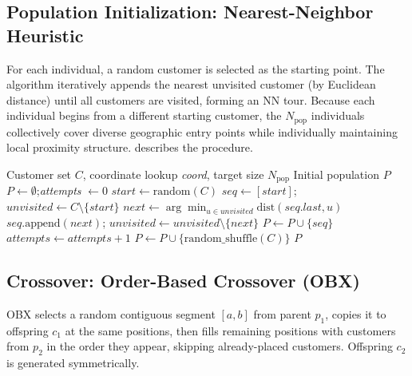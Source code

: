 \documentclass[11pt, a4paper]{article}
\numberwithin{equation}{section}
\begin{document}
\subsection{Population Initialization: Nearest-Neighbor Heuristic}
\label{sec:init}

For each individual, a random customer is selected as the starting point.
The algorithm iteratively appends the nearest unvisited customer (by Euclidean
distance) until all customers are visited, forming an NN tour.  Because each
individual begins from a different starting customer, the $N_{\mathrm{pop}}$
individuals collectively cover diverse geographic entry points while
individually maintaining local proximity structure.   describes the procedure.

\begin{algorithm}[ht]
\caption{NN Initialization for one population}
\label{alg:nn}
\begin{algorithmic}[1]
\Require Customer set $C$, coordinate lookup \textit{coord}, target size
         $N_{\mathrm{pop}}$
\Ensure Initial population $P$
\State $P \leftarrow \emptyset$;\quad \textit{attempts} $\leftarrow 0$
  \State $\textit{start} \leftarrow \mathrm{random}(C)$
  \State $\textit{seq} \leftarrow [\textit{start}]$;\quad
         $\textit{unvisited} \leftarrow C \setminus \{\textit{start}\}$
    \State $\textit{next} \leftarrow
           \arg\min_{u\in\textit{unvisited}}\mathrm{dist}(\textit{seq.last},u)$
    \State $\textit{seq}.\mathrm{append}(\textit{next})$;\quad
           $\textit{unvisited} \leftarrow \textit{unvisited}\setminus
           \{\textit{next}\}$
  \EndWhile
    \State $P \leftarrow P \cup \{\textit{seq}\}$
  \EndIf
  \State $\textit{attempts} \leftarrow \textit{attempts}+1$
\EndWhile
{}
  \State $P \leftarrow P \cup \{\mathrm{random\_shuffle}(C)\}$
\EndWhile
\State \Return $P$
\end{algorithmic}
\end{algorithm}

\subsection{Crossover: Order-Based Crossover (OBX)}

OBX selects a random contiguous segment $[a,b]$ from parent $p_1$, copies it
to offspring $c_1$ at the same positions, then fills remaining positions with
customers from $p_2$ in the order they appear, skipping already-placed
customers.  Offspring $c_2$ is generated symmetrically.
\end{document}
